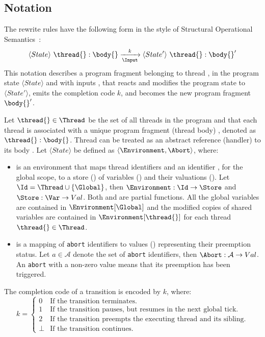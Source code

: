 
\subsection{Notation}
The rewrite rules have the following form in the style of 
Structural Operational Semantics~\cite{semantics_sos}:
\begin{equation*}
	\langle State \rangle ~ \thread{}:\body{} 
		\xrightarrow[\Input]{~~k~~} 
	\langle State' \rangle ~ \thread{}:\body{}'
\end{equation*}
This notation describes a program fragment \body{} belonging to thread \thread{},
in the program state $\langle State \rangle$ and with inputs \Input{}, that
reacts and modifies the program state to $\langle State' \rangle$, emits the 
completion code $k$, and becomes the new program fragment $\body{}'$. 

Let $\thread{} \in \Thread$ be the set of all threads in the program 
and that each thread \thread{} is associated with a unique program 
fragment (thread body) \body{}, denoted as $\thread{}:\body{}$.
Thread \thread{} can be treated as an abstract reference (handler) to its 
body \body{}. Let $\langle State \rangle$ be defined as 
$\langle \Environment, \Abort \rangle$, where:
\begin{itemize}
	\item \Environment{} is an environment that maps thread identifiers \Thread{} and an identifier 
		  \Global{}, for the global scope, to a store (\Store{}) of variables (\Var{}) and their 
		  valuations (\Val{}). Let $\Id = \Thread \cup \{\Global\}$, then $\Environment: \Id \to \Store$ and 
		  $\Store: \Var \to Val$. Both \Environment{} and \Store{} are partial functions. 
		  All the global variables are contained in $\Environment[\Global]$ 
		  and the modified copies of shared variables are contained in $\Environment[\thread{}]$
		  for each thread $\thread{} \in \Thread$.
		  
	\item \Abort{} is a mapping of \verb$abort$ identifiers to values (\Val{}) representing their preemption
		  status. Let $a \in \mathcal{A}$ denote the set of \verb$abort$ identifiers, then
		  $\Abort: \mathcal{A} \to Val$. An \verb$abort$ with a non-zero value means that its
		  preemption has been triggered.
\end{itemize}
The completion code of a transition is encoded by $k$, where:
\begin{equation*}
	k = \begin{cases}
		0		& \text{If the transition terminates.}										\\
		1		& \text{If the transition pauses, but resumes in the next global tick.}		\\
		2		& \text{If the transition preempts the executing thread and its sibling.}	\\
		\bot	& \text{If the transition continues.}
	\end{cases}
\end{equation*}


